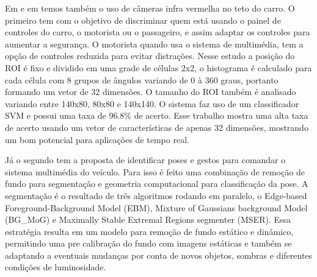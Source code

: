 Em \cite{cheng2008real} e em \cite{parada2014hand} temos também o uso de câmeras infra vermelha no teto do carro. O primeiro tem com o objetivo de discriminar quem está usando o painel de controles do carro, o motorista ou o passageiro, e assim adaptar os controles para aumentar a segurança. O motorista quando usa o sistema de multimédia, tem a opção de controles reduzida para evitar distrações. Nesse estudo a posição do ROI é fixo e dividido em uma grade de células 2x2, o histograma é calculado para cada célula com 8 grupos de ângulos variando de 0 à 360 graus, portanto formando um vetor de 32 dimensões. O tamanho do ROI também é analisado variando entre 140x80, 80x80 e 140x140. O sistema faz uso de um classificador SVM e possui uma taxa de 96.8\% de acerto. Esse trabalho mostra uma alta taxa de acerto usando um vetor de características de apenas 32 dimensões, mostrando um bom potencial para aplicações de tempo real.

Já o segundo tem a proposta de identificar poses e gestos para comandar o sistema multimédia do veículo. Para isso é feito uma combinação de remoção de fundo para segmentação e geometria computacional para classificação da pose. A segmentação é o resultado de três algoritmos rodando em paralelo, o Edge-based Foreground-Background Model (EBM), Mixture of Gaussians background Model (BG\_MoG) e Maximally Stable Extremal Regions segmenter (MSER). Essa estratégia resulta em um modelo para remoção de fundo estático e dinâmico, permitindo uma pre calibração do fundo com imagens estáticas e também se adaptando a eventuais mudanças por conta de novos objetos, sombras e diferentes condições de luminosidade.